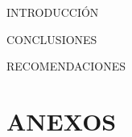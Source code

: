 \documentclass[unAutor, APA, hiperenlaces]{ThesisUTPL}
\begin{document}

%	
\begin{UnnumberedChapter}{INTRODUCCIÓN}
	
\end{UnnumberedChapter}
%
%
%
\ChapterFormat
%
%

%

%
%
\begin{UnnumberedChapter}{CONCLUSIONES}
	
\end{UnnumberedChapter}
%
\begin{UnnumberedChapter}{RECOMENDACIONES}
	
\end{UnnumberedChapter}
%
\paginaBibliografia{
	
}
\appendix
%
\chapter{ANEXOS}
%




	
\end{document}
